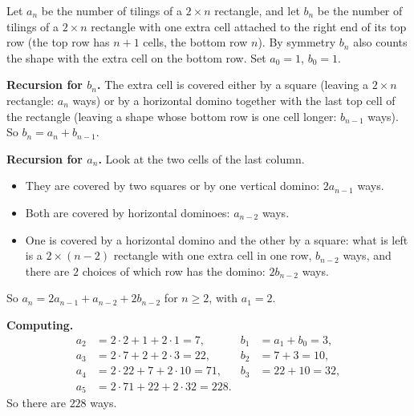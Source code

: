 Let $a_n$ be the number of tilings of a $2\times n$ rectangle, and let $b_n$ be the number of tilings of a $2\times n$ rectangle with one extra cell attached to the right end of its top row (the top row has $n+1$ cells, the bottom row $n$). By symmetry $b_n$ also counts the shape with the extra cell on the bottom row. Set $a_0=1$, $b_0=1$.

\textbf{Recursion for $b_n$.} The extra cell is covered either by a square (leaving a $2\times n$ rectangle: $a_n$ ways) or by a horizontal domino together with the last top cell of the rectangle (leaving a shape whose bottom row is one cell longer: $b_{n-1}$ ways). So $b_n=a_n+b_{n-1}$.

\textbf{Recursion for $a_n$.} Look at the two cells of the last column.
\begin{itemize}
\item They are covered by two squares or by one vertical domino: $2a_{n-1}$ ways.
\item Both are covered by horizontal dominoes: $a_{n-2}$ ways.
\item One is covered by a horizontal domino and the other by a square: what is left is a $2\times(n-2)$ rectangle with one extra cell in one row, $b_{n-2}$ ways, and there are $2$ choices of which row has the domino: $2b_{n-2}$ ways.
\end{itemize}
So $a_n=2a_{n-1}+a_{n-2}+2b_{n-2}$ for $n\ge2$, with $a_1=2$.

\textbf{Computing.}
\begin{align*}
a_2&=2\cdot2+1+2\cdot1=7, & b_1&=a_1+b_0=3,\\
a_3&=2\cdot7+2+2\cdot3=22, & b_2&=7+3=10,\\
a_4&=2\cdot22+7+2\cdot10=71, & b_3&=22+10=32,\\
a_5&=2\cdot71+22+2\cdot32=228.
\end{align*}
So there are $\boxed{228}$ ways.
